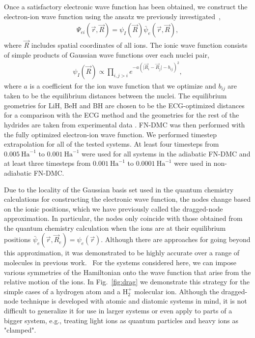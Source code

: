 \documentclass[pra,superscriptaddress,groupedaddress,twocolumn]{revtex4}
\begin{document}
Once a satisfactory electronic wave function has been obtained, we construct the electron-ion wave function using the ansatz we previously investigated~\cite{Tubman_ECG},
\begin{align}
\Psi_{ei}(\vec{r},\vec{R})=\psi_I(\vec{R})\bar{\psi}_e(\vec{r},\vec{R}), \label{eq:psi}
\end{align}
where $\vec{R}$ includes spatial coordinates of all ions. The ionic wave function consists of simple products of Gaussian wave functions over each nuclei pair,
\begin{align}
\psi_I(\vec{R})\propto \prod\limits_{i,j>i}e^{-a(\vert \vec{R}_i-\vec{R}_j\vert-b_{ij})^2},
\label{wfs_ions}
\end{align}
where $a$ is a coefficient for the ion wave function that we optimize and $b_{ij}$ are taken to be the equilibrium distances between the nuclei. The equilibrium geometries for LiH, BeH and BH are chosen to be the ECG-optimized distances for a comparison with the ECG method and the geometries for the rest of the hydrides are taken from experimental data \cite{CCCBDB}. FN-DMC was then performed with the fully optimized electron-ion wave function. We performed timestep extrapolation for all of the tested systems. At least four timesteps from $0.005~\text{Ha}^{-1}$ to $0.001~\text{Ha}^{-1}$ were used for all systems in the adiabatic FN-DMC and at least three timesteps from $0.001~\text{Ha}^{-1}$ to $0.0001~\text{Ha}^{-1}$ were used in non-adiabatic FN-DMC.

Due to the locality of the Gaussian basis set used in the quantum chemistry calculations for constructing the electronic wave function, the nodes change based on the ionic positions, which we have previously called the dragged-node approximation. In particular, the nodes only coincide with those obtained from the quantum chemistry calculation when the ions are at their equilibrium positions $\bar{\psi}_e(\vec{r},\vec{R}_e)=\psi_e(\vec{r})$. Although there are approaches for going beyond this approximation, it was demonstrated to be highly accurate over a range of molecules in previous work.~\cite{Tubman_ECG} For the systems considered here, we can impose various symmetries of the Hamiltonian onto the wave function that arise from the relative motion of the ions. In Fig.~\ref{fig:drag} we demonstrate this strategy for the simple cases of a hydrogen atom and a H$_2^+$ molecular ion. Although the dragged-node technique is developed with atomic and diatomic systems in mind, it is not difficult to generalize it for use in larger systems or even apply to parts of a bigger system, e.g., treating light ions as quantum particles and heavy ions as "clamped". 
\end{document}
